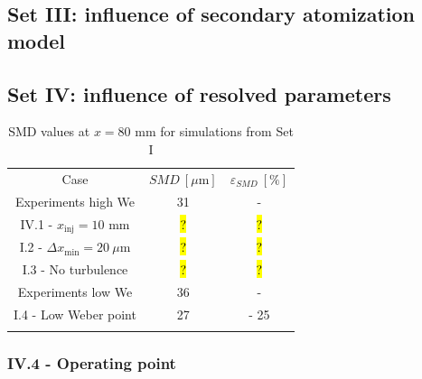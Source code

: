 \subsection{Set III: influence of secondary atomization model}

\subsection{Set IV: influence of resolved parameters}

\begin{table}[!h]
\centering
\caption{SMD values at $x = 80$ mm for simulations from Set I}
\begin{tabular}{ccc}
\thickhline
Case & $SMD~\left[\mu \mathrm{m} \right]$ & $\varepsilon_{SMD}~\left[\% \right]$ \\
\thickhline
Experiments high We & 31 & - \\
IV.1 - $x_\mathrm{inj} = 10$ mm & \hl{?} & \hl{?} \\
I.2 - $\Delta x_\mathrm{min} = 20~\mu$m & \hl{?} & \hl{?} \\
I.3 - No turbulence & \hl{?} & \hl{?} \\
\hline 
Experiments low We & 36 & - \\
I.4 - Low Weber point & 27 & - 25 \\
\thickhline
\end{tabular}
\label{tab:results_set_4}
\end{table}

\subsubsection{IV.4 - Operating point}


